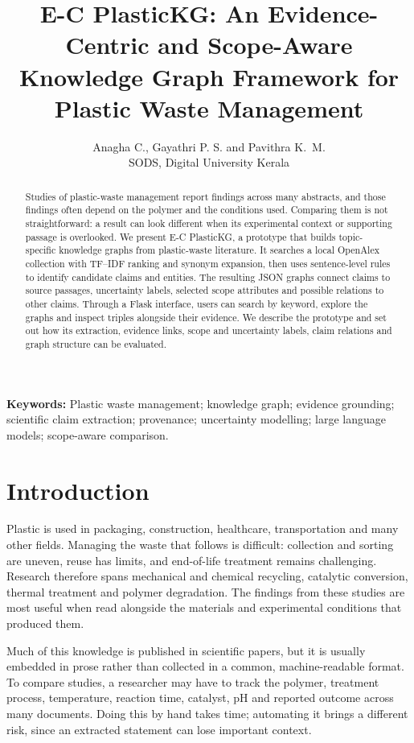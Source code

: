 \documentclass[11pt,a4paper]{article}
\title{\textbf{E-C PlasticKG: An Evidence-Centric and Scope-Aware Knowledge Graph Framework for Plastic Waste Management}}
\author{
  Anagha C., Gayathri P. S. and Pavithra K.\ M.\\
  \small SODS, Digital University Kerala
}
\date{}
\begin{document}
\maketitle

\begin{abstract}
Studies of plastic-waste management report findings across many abstracts, and those findings often depend on the polymer and the conditions used. Comparing them is not straightforward: a result can look different when its experimental context or supporting passage is overlooked. We present E-C PlasticKG, a prototype that builds topic-specific knowledge graphs from plastic-waste literature. It searches a local OpenAlex collection with TF--IDF ranking and synonym expansion, then uses sentence-level rules to identify candidate claims and entities. The resulting JSON graphs connect claims to source passages, uncertainty labels, selected scope attributes and possible relations to other claims. Through a Flask interface, users can search by keyword, explore the graphs and inspect triples alongside their evidence. We describe the prototype and set out how its extraction, evidence links, scope and uncertainty labels, claim relations and graph structure can be evaluated.
\end{abstract}

\noindent\textbf{Keywords:} Plastic waste management; knowledge graph; evidence grounding; scientific claim extraction; provenance; uncertainty modelling; large language models; scope-aware comparison.

\section{Introduction}

Plastic is used in packaging, construction, healthcare, transportation and many other fields. Managing the waste that follows is difficult: collection and sorting are uneven, reuse has limits, and end-of-life treatment remains challenging. Research therefore spans mechanical and chemical recycling, catalytic conversion, thermal treatment and polymer degradation. The findings from these studies are most useful when read alongside the materials and experimental conditions that produced them.

Much of this knowledge is published in scientific papers, but it is usually embedded in prose rather than collected in a common, machine-readable format. To compare studies, a researcher may have to track the polymer, treatment process, temperature, reaction time, catalyst, pH and reported outcome across many documents. Doing this by hand takes time; automating it brings a different risk, since an extracted statement can lose important context.
\end{document}
